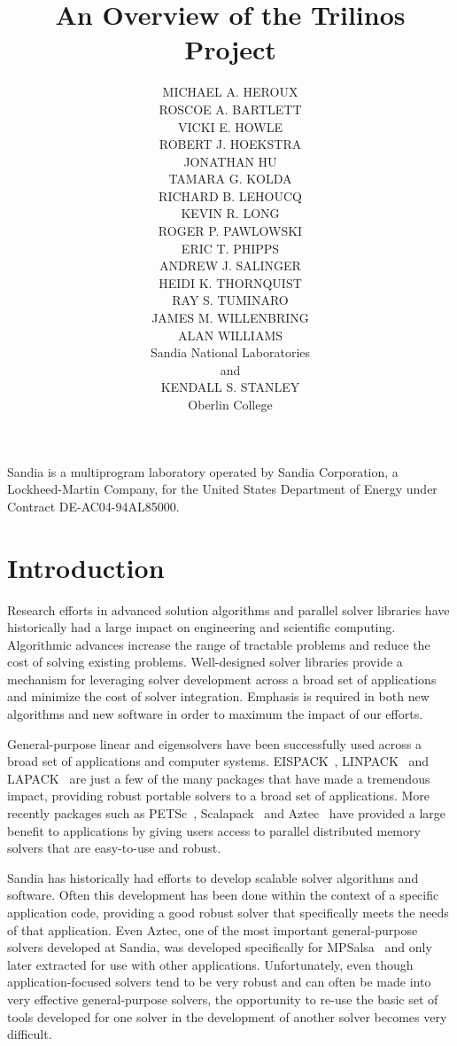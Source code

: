 \documentclass[acmtoms,acmnow]{acmtrans2m}
\title{An Overview of the Trilinos Project}
\author{MICHAEL A. HEROUX \\ 
ROSCOE A. BARTLETT \\
VICKI E. HOWLE \\
ROBERT J. HOEKSTRA \\
JONATHAN HU \\
TAMARA G. KOLDA \\
RICHARD B. LEHOUCQ \\
KEVIN R. LONG \\
ROGER P. PAWLOWSKI \\
ERIC T. PHIPPS \\
ANDREW J. SALINGER \\
HEIDI K. THORNQUIST \\
RAY S. TUMINARO \\
JAMES M. WILLENBRING \\
ALAN WILLIAMS \\
Sandia National Laboratories \\
and \\
KENDALL S. STANLEY \\
Oberlin College}
\begin{document}
\begin{bottomstuff}
Sandia is a multiprogram laboratory operated by Sandia Corporation, a
Lockheed-Martin Company, for the United States Department of Energy
under Contract DE-AC04-94AL85000.

\end{bottomstuff}

\maketitle


\section{Introduction}

Research efforts in advanced solution algorithms and parallel solver
libraries have historically had a large impact on engineering and
scientific computing.  Algorithmic advances increase the range
of tractable problems and reduce the cost of solving existing
problems.  Well-designed solver libraries provide a mechanism for
leveraging solver development across a broad set of applications and
minimize the cost of solver integration.  Emphasis is
required in both new algorithms and new software in order
to maximum the impact of our efforts.

General-purpose linear and eigensolvers have been successfully used across 
a broad set of applications and computer systems.  EISPACK~\cite{eispack}, 
LINPACK~\cite{linpack} and LAPACK~\cite{lapack} are just a few of
the many packages that have made a tremendous impact, providing robust 
portable solvers to a broad set of applications.  More recently packages 
such as PETSc~\cite{petsc-home-page,petsc-manual,petsc-efficient}, 
Scalapack~\cite{scalapack} and Aztec~\cite{Aztec2.1} have provided a large
benefit to applications by giving users access to parallel distributed 
memory solvers that are easy-to-use and robust.

Sandia has historically had efforts to develop scalable solver algorithms 
and software.  Often this development has been done within the context of 
a specific application code, providing a good robust solver that 
specifically meets the needs of that application.  Even Aztec, one of 
the most important general-purpose solvers developed at Sandia, was 
developed specifically for MPSalsa~\cite{MPSalsa-User-Guide,MPSalsa-Theory} 
and only later extracted for use with other applications.  Unfortunately, 
even though application-focused solvers tend to be very robust and can 
often be made into very effective general-purpose solvers, the 
opportunity to re-use the basic set of tools developed for one solver 
in the development of another solver becomes very difficult.
\end{document}
